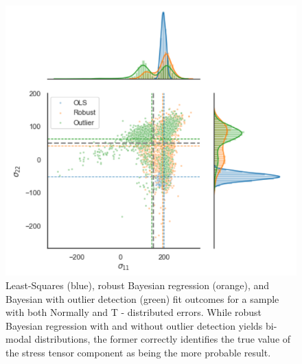 \newpage
\begin{figure}[h]
 	\centering
 	\includegraphics[width=1\textwidth]{chapters/chapter03/fig03/outlierS9.png}
 	\mycaption
 	{Least-Squares (blue), robust Bayesian regression (orange), and Bayesian with outlier detection (green) fit outcomes for a sample with both Normally and T - distributed errors. While robust Bayesian regression with and without outlier detection yields bi-modal distributions, the former correctly identifies the true value of the stress tensor component as being the more probable result.}
    \label{fig:RHP02}
 \end{figure}
\newpage
